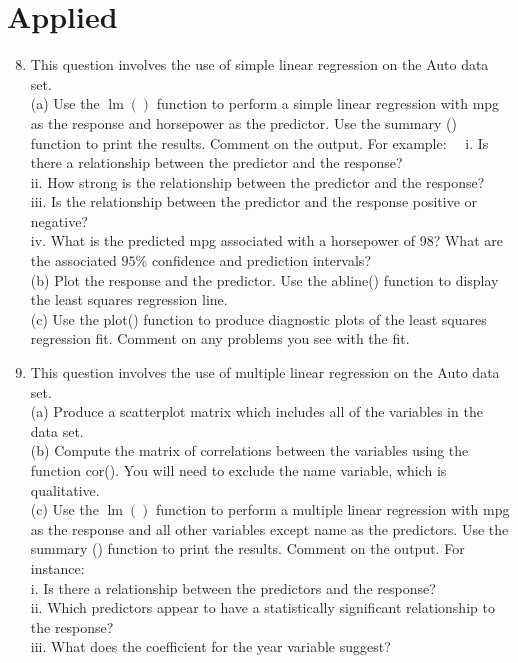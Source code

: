 \documentclass[10pt]{article}
\begin{document}
\section*{Applied}
\begin{enumerate}
  \setcounter{enumi}{7}
  \item This question involves the use of simple linear regression on the Auto data set.\\
(a) Use the $\operatorname{lm}()$ function to perform a simple linear regression with mpg as the response and horsepower as the predictor. Use the summary () function to print the results. Comment on the output. For example:\
\
i. Is there a relationship between the predictor and the response?\\
ii. How strong is the relationship between the predictor and the response?\\
iii. Is the relationship between the predictor and the response positive or negative?\\
iv. What is the predicted mpg associated with a horsepower of 98? What are the associated $95 \%$ confidence and prediction intervals?\\
(b) Plot the response and the predictor. Use the abline() function to display the least squares regression line.\\
(c) Use the plot() function to produce diagnostic plots of the least squares regression fit. Comment on any problems you see with the fit.
  \item This question involves the use of multiple linear regression on the Auto data set.\\
(a) Produce a scatterplot matrix which includes all of the variables in the data set.\\
(b) Compute the matrix of correlations between the variables using the function cor(). You will need to exclude the name variable, which is qualitative.\\
(c) Use the $\operatorname{lm}()$ function to perform a multiple linear regression with mpg as the response and all other variables except name as the predictors. Use the summary () function to print the results. Comment on the output. For instance:\\
i. Is there a relationship between the predictors and the response?\\
ii. Which predictors appear to have a statistically significant relationship to the response?\\
iii. What does the coefficient for the year variable suggest?\\

\end{enumerate}
\end{document}

